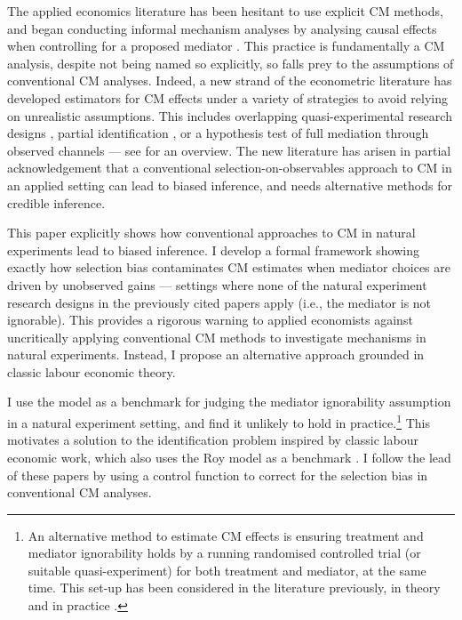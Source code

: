 The applied economics literature has been hesitant to use explicit CM methods, and began conducting informal mechanism analyses by analysing causal effects when controlling for a proposed mediator \citep{blackwell2024assumption}.
This practice is fundamentally a CM analysis, despite not being named so explicitly, so falls prey to the assumptions of conventional CM analyses.
Indeed, a new strand of the econometric literature has developed estimators for CM effects under a variety of strategies to avoid relying on unrealistic assumptions.
This includes overlapping quasi-experimental research designs \citep{deuchert2019direct,frolich2017direct,heckman2015econometric}, partial identification \citep{flores2009identification}, or a hypothesis test of full mediation through observed channels \citep{kwon2024testing} --- see \cite{huber2019review} for an overview.
The new literature has arisen in partial acknowledgement that a conventional selection-on-observables approach to CM in an applied setting can lead to biased inference, and needs alternative methods for credible inference.

This paper explicitly shows how conventional approaches to CM in natural experiments lead to biased inference.
I develop a formal framework showing exactly how selection bias contaminates CM estimates when mediator choices are driven by unobserved gains --- settings where none of the natural experiment research designs in the previously cited papers apply (i.e., the mediator is not ignorable).
This provides a rigorous warning to applied economists against uncritically applying conventional CM methods to investigate mechanisms in natural experiments.
Instead, I propose an alternative approach grounded in classic labour economic theory.

I use the \cite{roy1951some} model as a benchmark for judging the \cite{imai2010identification} mediator ignorability assumption in a natural experiment setting, and find it unlikely to hold in practice.\footnote{
    An alternative method to estimate CM effects is ensuring treatment and mediator ignorability holds by a running randomised controlled trial (or suitable quasi-experiment) for both treatment and mediator, at the same time.
    This set-up has been considered in the literature previously, in theory \citep{imai2013experimental,heckman2015econometric} and in practice \citep{ludwig2011mechanism,heckman2013understanding}.
}
This motivates a solution to the identification problem inspired by classic labour economic work, which also uses the Roy model as a benchmark \citep{heckman1979sample,heckman1990empirical}.
I follow the lead of these papers by using a control function to correct for the selection bias in conventional CM analyses.

